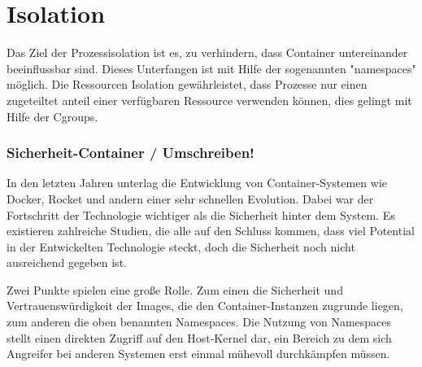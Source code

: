 \thispagestyle{empty}
\section{Isolation}

Das Ziel der Prozessisolation ist es, zu verhindern, dass Container untereinander beeinflussbar sind. Dieses Unterfangen ist mit Hilfe der sogenannten "namespaces" möglich. Die Ressourcen Isolation gewährleistet, dass Prozesse nur einen zugeteiltet anteil einer verfügbaren Ressource verwenden können, dies gelingt mit Hilfe der Cgroups.




\subsubsection{Sicherheit-Container / Umschreiben!}
In den letzten Jahren unterlag die Entwicklung von Container-Systemen wie Docker, Rocket und andern einer sehr schnellen Evolution. Dabei war der Fortschritt der Technologie wichtiger als die Sicherheit hinter dem System. Es existieren zahlreiche Studien, die alle auf den Schluss kommen, dass viel Potential in der Entwickelten Technologie steckt, doch die Sicherheit noch nicht ausreichend gegeben ist.

Zwei Punkte spielen eine große Rolle. Zum einen die Sicherheit und Vertrauenswürdigkeit der Images, die den Container-Instanzen zugrunde liegen, zum anderen die oben benannten Namespaces. Die Nutzung von Namespaces stellt einen direkten Zugriff auf den Host-Kernel dar, ein Bereich zu dem sich Angreifer bei anderen Systemen erst einmal mühevoll durchkämpfen müssen.